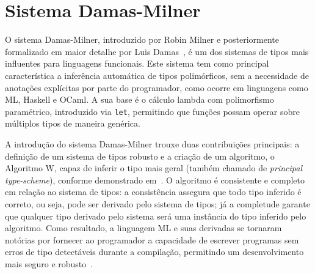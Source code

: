 \newcommand{\defas}{\ensuremath{\overset{def}{=}}}
\newcommand{\fv}{\ensuremath{\text{FV}}}
\newcommand{\fvc}{\ensuremath{\text{FVC}}}
\newcommand{\eeq}{\ensuremath{\overset{e}{=}}}
\newcommand{\Append}{\ensuremath{\texttt{++}}}
\newcommand{\If}{\ensuremath{\text{se}}}
\newcommand{\Let}{\ensuremath{\text{let}}}
\newcommand{\In}{\ensuremath{\text{in}}}
\newcommand{\Then}{\ensuremath{\text{então}}}
\newcommand{\Return}{\ensuremath{\text{retorna}}}
\newcommand{\Else}{\ensuremath{\text{senão}}}
\newcommand{\Elseif}{\ensuremath{\text{senão se}}}
\newcommand{\Fail}{\ensuremath{\text{falha}}}
\newcommand{\Unify}{\ensuremath{\textit{unify}}}
\newcommand{\Occurs}{\ensuremath{\textit{ocurrs}}}
\newcommand{\True}{\ensuremath{\texttt{Verdadeiro}}}
\newcommand{\False}{\ensuremath{\texttt{Falso}}}
\newcommand{\Whitespace}{\ensuremath{\texttt{ }}}

\section{Sistema Damas-Milner}\label{sec:damas-milner}

O sistema Damas-Milner, introduzido por Robin Milner e posteriormente formalizado em maior detalhe por Luis Damas~\cite{MILNER1978, DAMAS1982}, é um dos sistemas de tipos mais influentes para linguagens funcionais.
Este sistema tem como principal característica a inferência automática de tipos polimórficos, sem a necessidade de anotações explícitas por parte do programador, como ocorre em linguagens como ML, Haskell e OCaml.
A sua base é o cálculo lambda com polimorfismo paramétrico, introduzido via \texttt{let}, permitindo que funções possam operar sobre múltiplos tipos de maneira genérica.

A introdução do sistema Damas-Milner trouxe duas contribuições principais: a definição de um sistema de tipos robusto e a criação de um algoritmo, o Algoritmo W, capaz de inferir o tipo mais geral (também chamado de \textit{principal type-scheme}), conforme demonstrado em~.
O algoritmo é consistente e completo em relação ao sistema de tipos: a consistência assegura que todo tipo inferido é correto, ou seja, pode ser derivado pelo sistema de tipos; já a completude garante que qualquer tipo derivado pelo sistema será uma instância do tipo inferido pelo algoritmo.
Como resultado, a linguagem ML e suas derivadas se tornaram notórias por fornecer ao programador a capacidade de escrever programas sem erros de tipo detectáveis durante a compilação, permitindo um desenvolvimento mais seguro e robusto~\cite{MILNER1978, DAMAS1984}.

